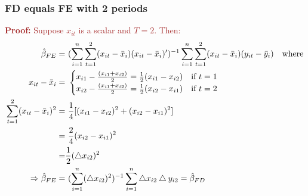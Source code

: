 \documentclass[a4paper,twoside,11pt]{article}
\begin{document}
\subsubsection{FD equals FE with 2 periods}
\textcolor{Brown}{
\textbf{Proof:} 
\newline
\newline
Suppose $x_{it}$ is a scalar and $T=2$. Then:
\begin{equation*}
\begin{aligned}
\hat{\beta}_{FE} =& \  (\sum^n_{i=1} \sum^2_{t=1} (x_{it} - \bar x_i ) (x_{it} - \bar x_i )')^{-1} \sum^n_{i=1} \sum^2_{t=1} (x_{it} - \bar x_i ) (y_{it} - \bar y_i) \ \ \ \textmd{where} \\
x_{it} - \bar x_{i} =& \  \begin{cases}
x_{i1} - \frac{(x_{i1} + x_{i2})}{2} = \frac{1}{2} (x_{i1} - x_{i2} ) \ \ \ \textmd{if} \ t=1 \\
x_{i2} - \frac{(x_{i1} + x_{i2})}{2} = \frac{1}{2} (x_{i2} - x_{i1} ) \ \ \ \textmd{if} \ t=2
\end{cases} \\ 
\sum^2_{t=1} (x_{it} - \bar x_i)^2 =& \  \frac{1}{4} [(x_{i1} - x_{i2})^2 + (x_{i2} - x_{i1})^2] \\
=& \ \frac{2}{4} (x_{i2} - x_{i1})^2 \\
=& \frac{1}{2} (\bigtriangleup x_{i2})^2 \\
\Rightarrow \hat{\beta}_{FE} =& \  (\sum^n_{i=1} (\bigtriangleup x_{i2})^2)^{-1} \sum^n_{i=1} \bigtriangleup x_{i2} \bigtriangleup y_{i2} = \hat{\beta}_{FD}
\end{aligned}
\end{equation*}}
\end{document}
